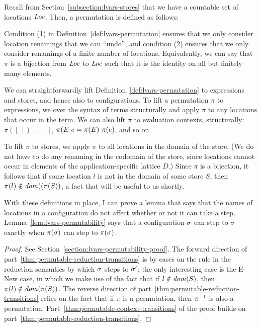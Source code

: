 Recall from Section~\ref{subsection:lvars-stores} that we have a
countable set of locations $\mathit{Loc}$.  Then, a permutation is defined as
follows:

\LVarsDefPermutation

Condition (1) in Definition~\ref{def:lvars-permutation} ensures that
we only consider location renamings that we can ``undo'', and
condition (2) ensures that we only consider renamings of a finite
number of locations.  Equivalently, we can say that $\pi$ is a
bijection from $\mathit{Loc}$ to $\mathit{Loc}$ such that it is the identity on all
but finitely many elements.

We can straightforwardly lift Definition~\ref{def:lvars-permutation}
to expressions and stores, and hence also to configurations.  To lift
a permutation $\pi$ to expressions, we over the syntax of terms
structurally and apply $\pi$ to any locations that occur in the term.
We can also lift $\pi$ to evaluation contexts, structurally: $\pi([~])
= [~]$, $\pi(E~e = \pi(E)~\pi(e)$, and so on.

To lift $\pi$ to stores, we apply $\pi$ to all locations in the domain
of the store.  (We do not have to do any renaming in the codomain of
the store, since locations cannot occur in elements of the
application-specific lattice $D$.)  Since $\pi$ is a bijection, it
follows that if some location $l$ is not in the domain of some store
$S$, then $\pi(l) \notin \mathit{dom}((\pi(S))$, a fact that will be useful to us shortly.

\LVarsDefPermutationExpression

\LVarsDefPermutationStore

\LVarsDefPermutationConfiguration

With these definitions in place, I can prove a lemma that says that
the names of locations in a configuration do not affect whether or not
it can take a step. Lemma~\ref{lem:lvars-permutability} says that a
configuration $\sigma$ can step to $\sigma$ exactly when $\pi(\sigma)$
can step to $\pi(\sigma)$.

\LVarsLemPermutability
\begin{proof}
  See Section~\ref{section:lvars-permutability-proof}.  The forward
  direction of part~\ref{thm:permutable-reduction-transitions} is by
  cases on the rule in the reduction semantics by which $\sigma$ steps
  to $\sigma'$; the only interesting case is the {\sc E-New} case, in
  which we make use of the fact that if $l \notin \mathit{dom}(S)$, then
  $\pi(l) \notin \mathit{dom}(\pi(S))$. The reverse direction of
  part~\ref{thm:permutable-reduction-transitions} relies on the fact
  that if $\pi$ is a permutation, then $\pi^{-1}$ is also a permutation.
  Part~\ref{thm:permutable-context-transitions} of the proof builds on
  part~\ref{thm:permutable-reduction-transitions}.
\end{proof}

